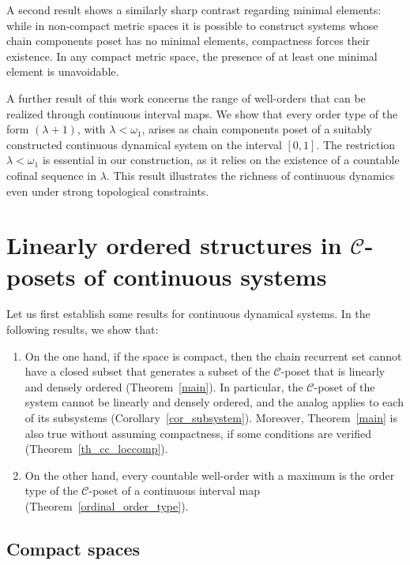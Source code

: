 \documentclass[pdflatex,sn-mathphys-num]{sn-jnl}
\theoremstyle{thmstyleone}%
\theoremstyle{thmstyletwo}%
\theoremstyle{thmstylethree}%
\begin{document}
\noindent A second result shows a similarly sharp contrast regarding minimal elements: while in non-compact metric spaces it is possible to construct systems whose chain components poset has no minimal elements, compactness forces their existence. In any compact metric space, the presence of at least one minimal element is unavoidable.

\noindent A further result of this work concerns the range of well-orders that can be realized through continuous interval maps. 
We show that every order type of the form $(\lambda + 1)$, with $\lambda < \omega_1$, arises as chain components poset of a suitably constructed continuous dynamical system on the interval \([0,1]\). 
The restriction \(\lambda < \omega_1\) is essential in our construction, as it relies on the existence of a countable cofinal sequence in $\lambda$. 
This result illustrates the richness of continuous dynamics even under strong topological constraints.


\section{Linearly ordered structures in $\mathcal{C}$-posets of continuous systems}
Let us first establish some results for continuous dynamical systems. 
In the following results, we show that: 
\begin{enumerate}
    \item On the one hand, if the space is compact, then the chain recurrent set cannot have a closed subset that generates a subset of the $\mathcal{C}$-poset that is linearly and densely ordered (Theorem~\ref{main}). 
    In particular, the $\mathcal{C}$-poset of the system cannot be linearly and densely ordered, and the analog applies to each of its subsystems (Corollary~\ref{cor_subsystem}). 
    Moreover, Theorem~\ref{main} is also true without assuming compactness, if some conditions are verified (Theorem~\ref{th_cc_loccomp}).
    \item On the other hand, every countable well-order with a maximum is the order type of the $\mathcal{C}$-poset of a continuous interval map (Theorem~\ref{ordinal_order_type}).
\end{enumerate} 

\subsection{Compact spaces}
\end{document}
